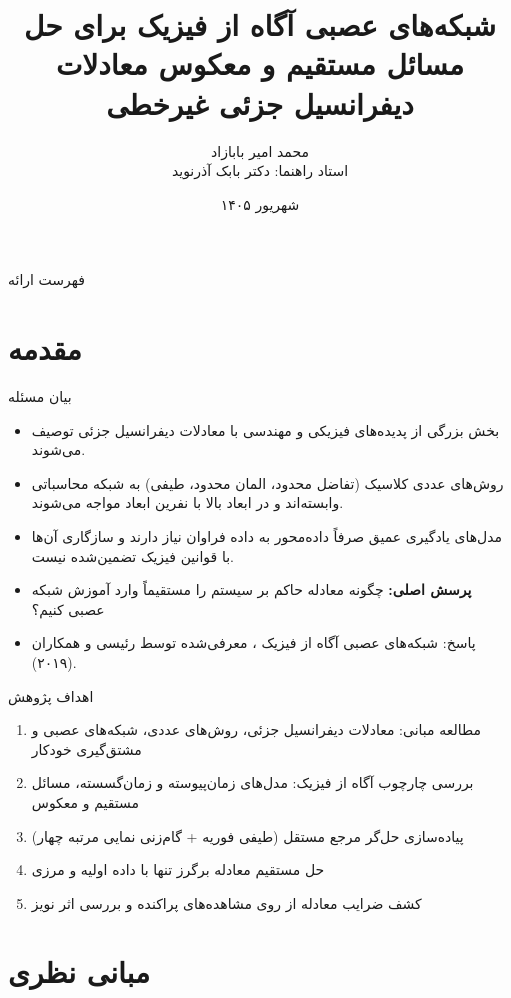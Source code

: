 \documentclass[12pt,aspectratio=169]{beamer}
\title[شبکه‌های عصبی آگاه از فیزیک]{شبکه‌های عصبی آگاه از فیزیک برای حل مسائل مستقیم و معکوس معادلات دیفرانسیل جزئی غیرخطی}
\author[محمد امیر بابازاد]{محمد امیر بابازاد \\ \small استاد راهنما: دکتر بابک آذرنوید}
\institute[دانشگاه بناب]{دانشگاه بناب، گروه علوم کامپیوتر}
\date{شهریور ۱۴۰۵}
\begin{document}
\begin{frame}[plain]
\titlepage
\end{frame}

\begin{frame}{فهرست ارائه}
\tableofcontents
\end{frame}

\section{مقدمه}

\begin{frame}{بیان مسئله}
\begin{itemize}
\item بخش بزرگی از پدیده‌های فیزیکی و مهندسی با معادلات دیفرانسیل جزئی  توصیف می‌شوند.
\item روش‌های عددی کلاسیک (تفاضل محدود، المان محدود، طیفی) به شبکه محاسباتی وابسته‌اند و در ابعاد بالا با نفرین ابعاد مواجه می‌شوند.
\item مدل‌های یادگیری عمیق صرفاً داده‌محور به داده فراوان نیاز دارند و سازگاری آن‌ها با قوانین فیزیک تضمین‌شده نیست.
\item \textbf{پرسش اصلی:} چگونه معادله حاکم بر سیستم را مستقیماً وارد آموزش شبکه عصبی کنیم؟
\item پاسخ: شبکه‌های عصبی آگاه از فیزیک ، معرفی‌شده توسط رئیسی و همکاران (۲۰۱۹).
\end{itemize}
\end{frame}

\begin{frame}{اهداف پژوهش}
\begin{enumerate}
\item مطالعه مبانی: معادلات دیفرانسیل جزئی، روش‌های عددی، شبکه‌های عصبی و مشتق‌گیری خودکار
\item بررسی چارچوب آگاه از فیزیک: مدل‌های زمان‌پیوسته و زمان‌گسسته، مسائل مستقیم و معکوس
\item پیاده‌سازی حل‌گر مرجع مستقل (طیفی فوریه + گام‌زنی نمایی مرتبه چهار)
\item حل مستقیم معادله برگرز تنها با داده اولیه و مرزی
\item کشف ضرایب معادله از روی مشاهده‌های پراکنده و بررسی اثر نویز
\end{enumerate}
\end{frame}

\section{مبانی نظری}
\end{document}
